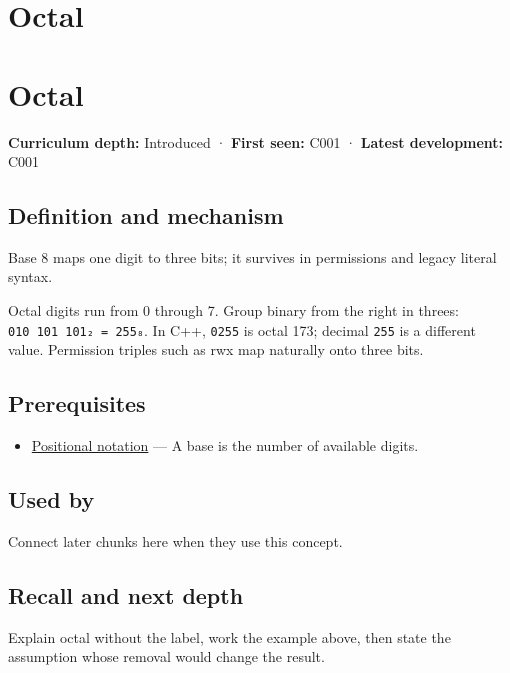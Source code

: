 \hypertarget{appendix-17fc1bc8b305}{}
\section*{Octal}
\section{Octal}\label{appendix-17fc1bc8b305-octal}

\textbf{Curriculum depth:} Introduced · \textbf{First seen:} C001 · \textbf{Latest development:} C001

\subsection{Definition and mechanism}\label{appendix-17fc1bc8b305-definition-and-mechanism}

Base 8 maps one digit to three bits; it survives in permissions and legacy literal syntax.

Octal digits run from 0 through 7. Group binary from the right in threes: \texttt{010\ 101\ 101₂\ =\ 255₈}. In C++, \texttt{0255} is octal 173; decimal \texttt{255} is a different value. Permission triples such as rwx map naturally onto three bits.

\subsection{Prerequisites}\label{appendix-17fc1bc8b305-prerequisites}

\begin{itemize}
\tightlist
\item
  \hyperref[appendix-83c3f28f7bda]{Positional notation} --- A base is the number of available digits.
\end{itemize}

\subsection{Used by}\label{appendix-17fc1bc8b305-used-by}

Connect later chunks here when they use this concept.

\subsection{Recall and next depth}\label{appendix-17fc1bc8b305-recall-and-next-depth}

Explain octal without the label, work the example above, then state the assumption whose removal would change the result.

